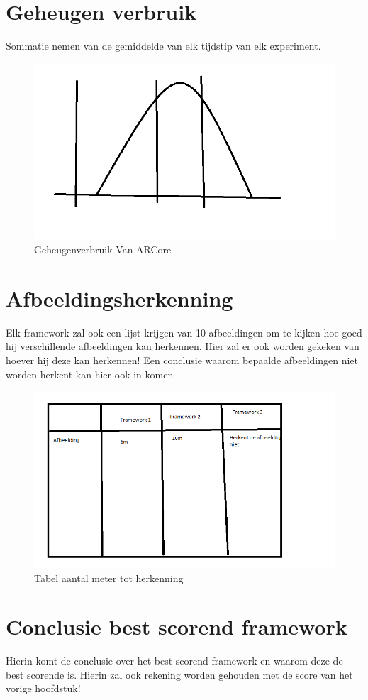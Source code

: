\section{Geheugen verbruik}
Sommatie nemen van de gemiddelde van elk tijdstip van elk experiment.
\begin{figure}
    \includegraphics[width=\textwidth]{img/normaleverdeling}\caption{Geheugenverbruik Van ARCore}\label{fig:mem1}
\end{figure}
\section{Afbeeldingsherkenning}
Elk framework zal ook een lijst krijgen van 10 afbeeldingen om te kijken hoe goed hij verschillende afbeeldingen kan herkennen. Hier zal er ook worden gekeken van hoever hij deze kan herkennen!
Een conclusie waarom bepaalde afbeeldingen niet worden herkent kan hier ook in komen
\begin{figure}
    \includegraphics[width=\textwidth]{img/imgrex}\caption{Tabel aantal meter tot herkenning}\label{fig:imgrex}
\end{figure}
\section{Conclusie best scorend framework}
Hierin komt de conclusie over het best scorend framework en waarom deze de best scorende is. Hierin zal ook rekening worden gehouden met de score van het vorige hoofdstuk!